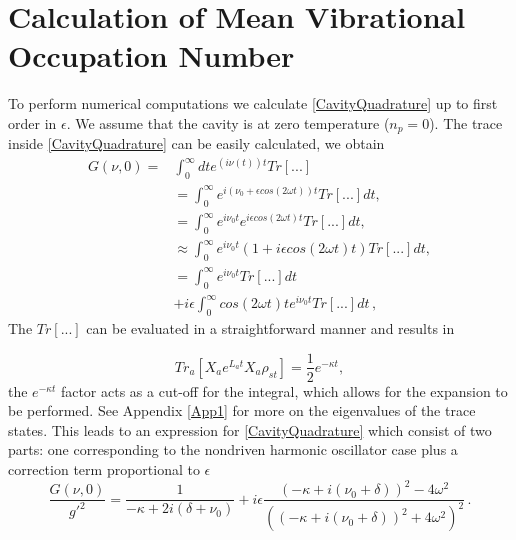\documentclass[reprint, amsmath,amssymb, aps,pra]{revtex4-1}
\begin{document}
\section{Calculation of Mean Vibrational Occupation Number}\label{NumCal}

To perform numerical computations we calculate
\eqref{CavityQuadrature} up to first order in $\epsilon$. We assume
that the cavity is at zero temperature ($n_p=0$).  The trace inside
\eqref{CavityQuadrature} can be easily calculated, we obtain
\begin{align}
G(\nu,0)=&\int_0^\infty dt e^{(i\nu(t)) t}Tr[...]\nonumber\\
&= \int_0^\infty e^{i(\nu_0 + \epsilon cos(2\omega t) )t} Tr[...]dt, \nonumber\\
&=\int_0^\infty e^{i \nu_0 t}e^{i \epsilon cos(2\omega t)t} Tr[...]dt, \nonumber\\
&\approx \int_0^\infty e^{i \nu_0 t}(1+i \epsilon cos(2\omega t)t) Tr[...]dt, \nonumber\\
&=\int_0^\infty e^{i \nu_0 t}Tr[...]dt\nonumber\\
&+i\epsilon\int_0^\infty cos(2\omega t)t e^{i \nu_0 t}Tr[...]dt\, ,\nonumber
\end{align}The $Tr[...]$ can be evaluated in a straightforward manner and results in

\begin{equation}
Tr_a[X_a e^{L_a t} X_a \rho_{st}] = \frac{1}{2}e^{-\kappa t},
\end{equation} the $e^{-\kappa t}$ factor acts as a cut-off for the integral, which allows for the expansion to be performed. See Appendix \ref{App1} for more on the eigenvalues of the trace states.
This leads to an expression for \eqref{CavityQuadrature} which consist
of two parts: one corresponding to the nondriven harmonic oscillator
case plus a correction term proportional to $\epsilon$
\begin{equation}
\frac{G(\nu,0)}{g'^2}= \frac{1}{-\kappa + 2i(\delta + \nu_0)} +i\epsilon\frac{(-\kappa + i(\nu_0 + \delta))^2 - 4\omega^2}{((-\kappa + i(\nu_0 + \delta))^2 + 4\omega^2)^2}\, .
\end{equation} %
\end{document}
